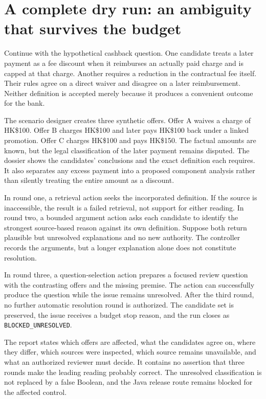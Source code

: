 \section{A complete dry run: an ambiguity that survives the budget}
\label{merge:M06:21}


Continue with the hypothetical cashback question. One candidate treats a later
payment as a fee discount when it reimburses an actually paid charge and is capped
at that charge. Another requires a reduction in the contractual fee itself.
Their rules agree on a direct waiver and disagree on a later reimbursement.
Neither definition is accepted merely because it produces a convenient outcome
for the bank.

The scenario designer creates three synthetic offers. Offer A waives a charge of
HK\$100. Offer B charges HK\$100 and later pays HK\$100 back under a linked
promotion. Offer C charges HK\$100 and pays HK\$150. The factual amounts are known,
but the legal classification of the later payment remains disputed. The dossier
shows the candidates' conclusions and the exact definition each requires. It
also separates any excess payment into a proposed component analysis rather than
silently treating the entire amount as a discount.

In round one, a retrieval action seeks the incorporated definition. If the source
is inaccessible, the result is a failed retrieval, not support for either
reading. In round two, a bounded argument action asks each candidate to identify
the strongest source-based reason against its own definition. Suppose both
return plausible but unresolved explanations and no new authority. The controller
records the arguments, but a longer explanation alone does not constitute
resolution.


In round three, a question-selection action prepares a focused review question
with the contrasting offers and the missing premise. The action can successfully
produce the question while the issue remains unresolved. After the third round,
no further automatic resolution round is authorized. The candidate set is
preserved, the issue receives a budget stop reason, and the run closes as
\texttt{BLOCKED\_UNRESOLVED}.

The report states which offers are affected, what the candidates agree on, where
they differ, which sources were inspected, which source remains unavailable, and
what an authorized reviewer must decide. It contains no assertion that three
rounds make the leading reading probably correct. The unresolved classification
is not replaced by a false Boolean, and the Java release route remains blocked
for the affected control.

